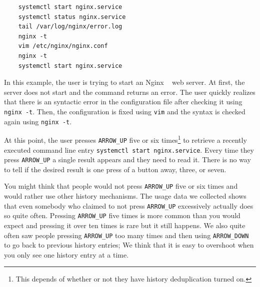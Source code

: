 \documentclass[thesis=M,english]{FITthesis}[2012/10/20]
\newcommand{\redtext}[1]{\textcolor{red}{[[#1]]}}
\let\myCite\cite
\renewcommand\cite{\unskip~\myCite}
\begin{document}
\begin{verbatim}
    systemctl start nginx.service
    systemctl status nginx.service
    tail /var/log/nginx/error.log
    nginx -t
    vim /etc/nginx/nginx.conf
    nginx -t
    systemctl start nginx.service
\end{verbatim}

In this example, the user is trying to start an Nginx \cite{reese2008nginx} web server. At first, the server does not start and the command returns an error. The user quickly realizes that there is an syntactic error in the configuration file after checking it using \verb|nginx -t|. Then, the configuration is fixed using \verb|vim| and the syntax is checked again using \verb|nginx -t|. 

At this point, the user presses \verb|ARROW_UP| five or six times\footnote{This depends of whether or not they have history deduplication turned on.} to retrieve a recently executed command line entry \verb|systemctl start nginx.service|. Every time they press \verb|ARROW_UP| a single result appears and they need to read it. There is no way to tell if the desired result is one press of a button away, three, or seven. %



You might think that people would not press \verb|ARROW_UP| five or six times and would rather use other history mechanisms.
The usage data we collected shows that even somebody who claimed to not press \verb|ARROW_UP| excessively actually does so quite often. Pressing \verb|ARROW_UP| five times is more common than you would expect and pressing it over ten times is rare but it still happens. We also quite often saw people pressing \verb|ARROW_UP| too many times and then using \verb|ARROW_DOWN| to go back to previous history entries; We think that it is easy to overshoot when you only see one history entry at a time.


\end{document}
